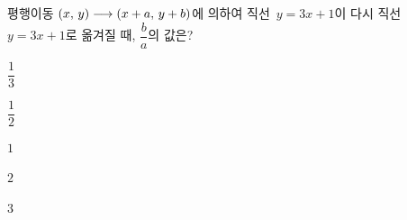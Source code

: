 평행이동 $(x,\mkern3mu y)\longrightarrow(x+a,\mkern3mu y+b)$에 의하여 직선~$y=3x+1$이 다시 직선~$y=3x+1$로 옮겨질 때, $\dfrac{b}{a}$의 값은? 
\begin{choices32}{\rule[-3ex]{0pt}{8ex}$\dfrac{1}{3}$}{\rule[-3ex]{0pt}{8ex}$\dfrac{1}{2}$}{\rule[-3ex]{0pt}{8ex}$1$}{\rule[-3ex]{0pt}{8ex}$2$}{\rule[-3ex]{0pt}{8ex}$3$}\end{choices32}
